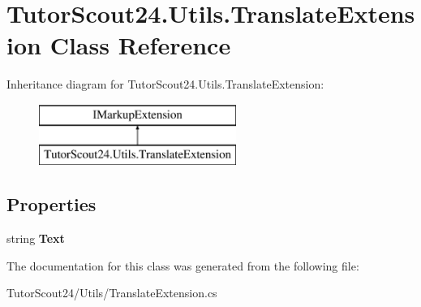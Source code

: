 \hypertarget{class_tutor_scout24_1_1_utils_1_1_translate_extension}{}\section{Tutor\+Scout24.\+Utils.\+Translate\+Extension Class Reference}
\label{class_tutor_scout24_1_1_utils_1_1_translate_extension}
Inheritance diagram for Tutor\+Scout24.\+Utils.\+Translate\+Extension\+:\begin{figure}[H]
\begin{center}
\leavevmode
\includegraphics[height=2.000000cm]{class_tutor_scout24_1_1_utils_1_1_translate_extension}
\end{center}
\end{figure}
\subsection*{Properties}
\begin{DoxyCompactItemize}
\item 
\mbox{\label{class_tutor_scout24_1_1_utils_1_1_translate_extension_a4d8592849f03894af6d5544fde4a6202}} 
string {\bfseries Text}
\end{DoxyCompactItemize}


The documentation for this class was generated from the following file\+:\begin{DoxyCompactItemize}
\item 
Tutor\+Scout24/\+Utils/Translate\+Extension.\+cs\end{DoxyCompactItemize}
